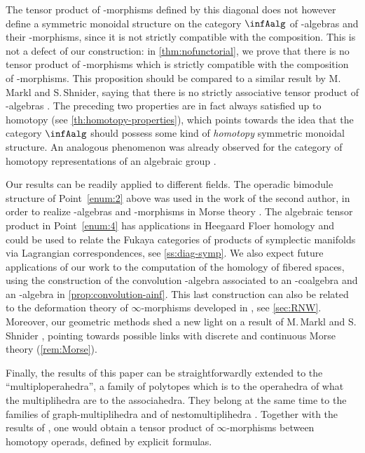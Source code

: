 \documentclass[JEP,XML,SOM,NoFloatCountersInSection,Unicode,published]{cedram}
\theoremstyle{definition}
\theoremstyle{plain}
\begin{document}
The tensor product of \Ainf-morphisms defined by this diagonal does not however define a symmetric monoidal structure on the category $\infAalg$ of \Ainf-algebras and their \Ainf-morphisms, since it is not strictly compatible with the composition.
This is not a defect of our construction: in \cref{thm:nofunctorial}, we prove that there is no tensor product of \Ainf-morphisms which is strictly compatible with the composition of \Ainf-morphisms.
This proposition should be compared to a similar result by M.\,Markl and S.\,Shnider, saying that there is no strictly associative tensor product of \Ainf-algebras \cite[Th.\,13]{MarklShnider06}.
The preceding two properties are in fact always satisfied up to homotopy (see \cref{th:homotopy-properties}), which points towards the idea that the category $\infAalg$ should possess some kind of \textit{homotopy} symmetric monoidal structure.
An analogous phenomenon was already observed for the category of homotopy representations of an algebraic group \cite{AriasAbadCrainicDherin11,poliakova2020cellular}.

Our results can be readily applied to different fields.
The operadic bimodule structure of Point~\eqref{enum:2} above was used in the work of the second author, in order to realize \Ainf-algebras and \Ainf-morphisms in Morse theory \cite{mazuir-I,mazuir-II}.
The algebraic tensor product in Point~\eqref{enum:4} has applications in Heegaard Floer homology and could be used to relate the Fukaya categories of products of symplectic manifolds via \hbox{Lagrangian} correspondences, see \cref{ss:diag-symp}.
We also expect future applications of our work to the computation of the homology of fibered spaces, using the construction of the convolution \Ainf-algebra associated to an \Ainf-coalgebra and an \Ainf-algebra in \cref{prop:convolution-ainf}.
This last construction can also be related to the deformation theory of $\infty$-morphisms developed in \cite{RobertNicoudWierstraI,RobertNicoudWierstraII}, see \cref{sec:RNW}.
Moreover, our geometric methods shed a new light on a result of M.\,Markl and S.\,Shnider \cite{MarklShnider06}, pointing towards possible links with discrete and continuous Morse theory (\cref{rem:Morse}).

Finally, the results of this paper can be straightforwardly extended to the ``multiploperahedra'', a family of polytopes which is to the operahedra of \cite{LA21} what the multiplihedra are to the associahedra.
They belong at the same time to the families of graph-multiplihedra \cite{DevadossForcey08} and of nestomultiplihedra \cite{AD13}.
Together with the results of \cite[\S 4]{LA21}, one would obtain a tensor product of $\infty$-morphisms between homotopy operads, defined by explicit formulas.
\end{document}
